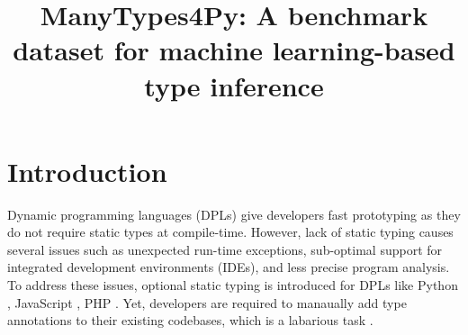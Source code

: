 \documentclass[10pt, conference]{IEEEtran}
\begin{document}
\title{ManyTypes4Py: A benchmark dataset for machine learning-based type inference\\
}

\author{
\and
{}
\and
{}
}

\maketitle

\begin{abstract}

\end{abstract}

\begin{IEEEkeywords}
\end{IEEEkeywords}

\section{Introduction}
Dynamic programming languages (DPLs) give developers fast prototyping as they do not require static types at compile-time. However, lack of static typing causes several issues such as unexpected run-time exceptions, sub-optimal support for integrated development environments (IDEs), and less precise program analysis. To address these issues, optional static typing is introduced for DPLs like Python \cite{van2014pep}, JavaScript \cite{bierman2014understanding}, PHP \cite{klingstrom2020type}. Yet, developers are required to manaually add type annotations to their existing codebases, which is a labarious task \cite{ore2018assessing}.
\end{document}
